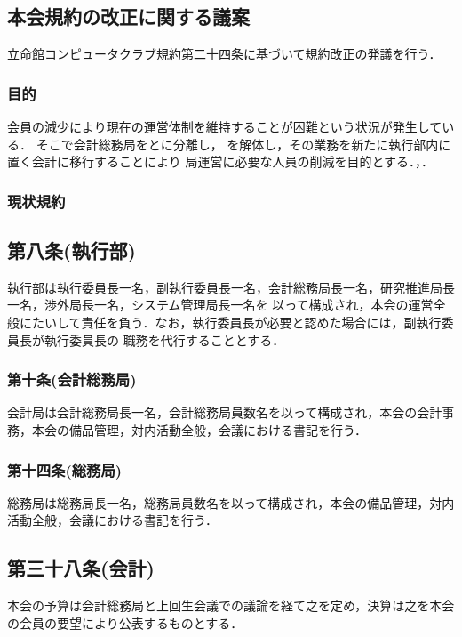 \subsection*{本会規約の改正に関する議案}

立命館コンピュータクラブ規約第二十四条に基づいて規約改正の発議を行う．

\subsubsection*{目的}
会員の減少により現在の運営体制を維持することが困難という状況が発生している．
そこで会計総務局を\kaikeiDepartment{}と\soumuDepartment{}に分離し，
\kaikeiDepartment{}を解体し，その業務を新たに執行部内に置く会計に移行することにより
局運営に必要な人員の削減を目的とする．，．

\subsubsection*{現状規約}
\subsection*{第八条(執行部)}
執行部は執行委員長一名，副執行委員長一名，会計総務局長一名，研究推進局長一名，渉外局長一名，システム管理局長一名を
以って構成され，本会の運営全般にたいして責任を負う．なお，執行委員長が必要と認めた場合には，副執行委員長が執行委員長の
職務を代行することとする．

\subsubsection*{第十条(会計総務局)}
会計局は会計総務局長一名，会計総務局員数名を以って構成され，本会の会計事務，本会の備品管理，対内活動全般，会議における書記を行う．

\subsubsection*{第十四条(総務局)}
総務局は総務局長一名，総務局員数名を以って構成され，本会の備品管理，対内活動全般，会議における書記を行う．

\subsection*{第三十八条(会計)}
本会の予算は会計総務局と上回生会議での議論を経て之を定め，決算は之を本会の会員の要望により公表するものとする．

